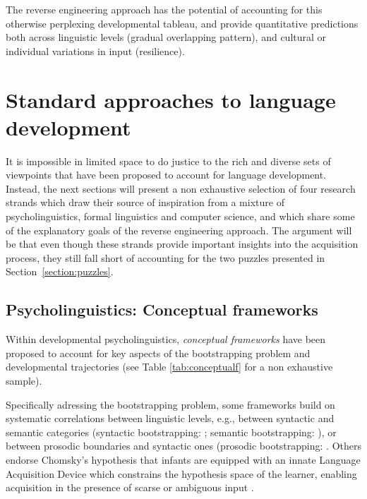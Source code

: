 \documentclass[jou,apacite]{apa6}
\begin{document}
The reverse engineering approach has the potential of accounting for this otherwise perplexing developmental tableau, and provide quantitative predictions both across linguistic levels (gradual overlapping pattern), and cultural or individual variations in input (resilience).





\section{Standard approaches to language development}\label{section:past}





It is impossible in limited space to do justice to the rich and diverse sets of viewpoints that have been proposed to account for language development. Instead, the next sections will present a non exhaustive selection of four research strands which draw their source of inspiration from a mixture of psycholinguistics, formal linguistics and computer science, and which share some of the explanatory goals of the reverse engineering approach. The argument will be that even though these strands provide important insights into the acquisition process, they still fall short of accounting for the two puzzles presented in Section~\ref{section:puzzles}.




\subsection{Psycholinguistics: Conceptual frameworks}











Within developmental psycholinguistics, \emph{conceptual frameworks} have been proposed to account for key aspects of the bootstrapping problem and developmental trajectories (see Table \ref{tab:conceptualf} for a non exhaustive sample). 

Specifically adressing the bootstrapping problem, some frameworks build on systematic correlations between linguistic levels,  e.g., between syntactic and semantic categories (syntactic bootstrapping: ; semantic bootstrapping: ), or between prosodic boundaries and syntactic ones (prosodic bootstrapping: . %
Others endorse Chomsky's \citeyear{chomsky_65} hypothesis that infants are equipped with an innate Language Acquisition Device %
which constrains the hypothesis space of the learner, enabling acquisition in the presence of scarse or ambiguous input \cite{crain_91,lidz_2015}.
\end{document}
